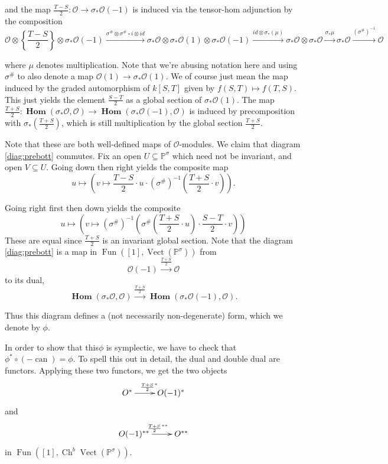 \documentclass[edeposit,fullpage]{uiucthesis2009}
\newcommand{\mbb}{\mathbb}
\newcommand{\mc}{\mathcal}
\DeclareMathOperator{\can}{can}
\DeclareMathOperator{\iHom}{\mathbf{Hom}}
\DeclareMathOperator{\Ch}{Ch}
\DeclareMathOperator{\Fun}{Fun}
\DeclareMathOperator{\Vect}{Vect}
\theoremstyle{plain}
\numberwithin{lemma}{section}
\theoremstyle{definition}
\begin{document}
and the map  $\frac{T-S}{2} : \mc O \rightarrow \sigma_*\mc
O(-1)$ is induced via the tensor-hom adjunction by the composition 
\[
\mc O \otimes \left\{\frac{T-S}{2}\right\} \otimes \sigma_* \mc O(-1)
\xrightarrow{\sigma^\# \otimes  \sigma^\# \circ i \otimes id}
\sigma_*\mc O \otimes \sigma_*\mc O(1) \otimes \sigma_*\mc O(-1)  
\xrightarrow{ id \otimes \sigma_*(\mu)} \sigma_*\mc O \otimes \sigma_*\mc
O \xrightarrow{\sigma_*\mu} \sigma_*\mc O
\xrightarrow{(\sigma^\#)^{-1}} \mc O
\]

where $\mu$ denotes multiplication. Note that we're abusing notation
here and using $\sigma^\#$ to also denote a map $\mc O(1) \rightarrow
\sigma_* \mc O(1)$. We of course just mean the map induced by the
graded automorphism of $k[S,T]$ given by $f(S,T) \mapsto f(T,S)$. This
just yields the element $\frac{S-T}{2}$ as a global section of
$\sigma_*\mc O(1)$. The map $\frac{T+S}{2} :
\iHom(\sigma_* \mc O, \mc O) \rightarrow \iHom(\sigma_* \mc O(-1),\mc
O)$ is induced by precomposition with $\sigma_*(\frac{T+S}{2})$, which is still
multiplication by the global section $\frac{T+S}{2}$. 

Note that these are both well-defined maps of $\mc O$-modules. We
claim that diagram \ref{diag:prebott} commutes. Fix an open $U
\subseteq \mbb P^\sigma$ which need not be invariant, and open $V
\subseteq U$. Going down then right yields the
composite map
\[
u \mapsto (v \mapsto \frac{T-S}{2} \cdot u \cdot
(\sigma^\#)^{-1}\left(\frac{T+S}{2}\cdot v\right)).
\]

Going right first then down yields the composite
\[
u \mapsto (v \mapsto (\sigma^\#)^{-1}(\sigma^\#(\frac{T+S}{2} \cdot u
)\cdot \frac{S-T}{2}\cdot v))
\]
These are equal since $\frac{T+S}{2}$ is an invariant global
section. Note that the diagram \ref{diag:prebott} is a map in
$\Fun([1],\Vect(\mbb P^\sigma))$ from 
\[
\mc O(-1) \xrightarrow{\frac{T+S}{2}} \mc O
\]
to its dual,
\[
\iHom(\sigma_*\mc
  O,\mc O) \xrightarrow{\frac{T+S}{2}}  \iHom(\sigma_* \mc O(-1),\mc O).
\]

Thus this diagram defines a (not necessarily non-degenerate) form,
which we denote by $\phi$. 

In order to show that this$\phi$ is symplectic, we have to check that
$\phi^* \circ (-\can) = \phi$. To spell this out in detail, the dual
and double dual are functors. Applying these two functors, we get the
two objects
\[
\xymatrix{O^* \ar[r]^{\frac{T+S}{2}^\ast} & O(-1)^*}
\]
and
\[
\xymatrix{O(-1)^{\ast\ast} \ar[r]^{\frac{T+S}{2}^{\ast\ast}} & O^{\ast\ast}}
\]
in  $\Fun([1],\Ch^b\Vect(\mbb P^\sigma))$.
\end{document}

